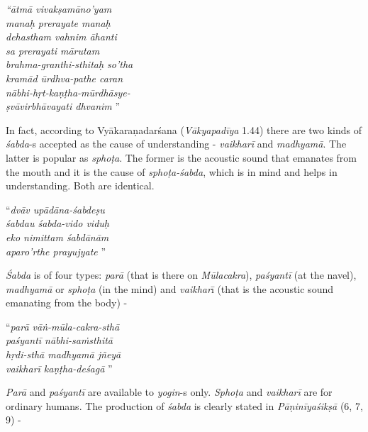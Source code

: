 \begin{centerquote}
\textit{“ātmā vivakṣamāno’yam}\\ \textit{manaḥ prerayate manaḥ} \\ \textit{dehastham vahnim āhanti}\\ \textit{sa prerayati mārutam} \\ \textit{brahma-granthi-sthitaḥ so’tha}\\ \textit{kramād ūrdhva-pathe caran} \\ \textit{nābhi-hṛt-kaṇṭha-mūrdhāsye-}\\ \textit{ṣvāvirbhāvayati dhvanim} ”
\end{centerquote}

In fact, according to Vyākaraṇadarśana (\textit{Vākyapadīya} 1.44) there are two kinds of \textit{śabda}-s accepted as the cause of understanding - \textit{vaikharī} and \textit{madhyamā}. The latter is popular as \textit{sphoṭa}. The former is the acoustic sound that emanates from the mouth and it is the cause of \textit{sphoṭa-śabda}, which is in mind and helps in understanding. Both are identical.

\begin{centerquote}
“\textit{dvāv upādāna-śabdeṣu}\\ \textit{śabdau śabda-vido viduḥ} \\ \textit{eko nimittam śabdānām}\\ \textit{aparo’rthe prayujyate} ”
\end{centerquote}

\textit{Śabda} is of four types: \textit{parā} (that is there on \textit{Mūlacakra}), \textit{paśyantī} (at the navel), \textit{madhyamā} or \textit{sphoṭa} (in the mind) and \textit{vaikhar}ī (that is the acoustic sound emanating from the body) -

\begin{centerquote}
“\textit{parā vāṅ-mūla-cakra-sthā}\\ \textit{paśyantī nābhi-saṁsthitā }\\ \textit{hṛdi-sthā madhyamā jñeyā}\\ \textit{vaikharī kaṇṭha-deśagā} ” 
\end{centerquote}

\textit{Parā} and \textit{paśyantī} are available to \textit{yogin}-s only. \textit{Sphoṭa} and \textit{vaikharī} are for ordinary humans. The production of \textit{śabda} is clearly stated in \textit{Pāṇinīyaśikṣā} (6, 7, 9) -

